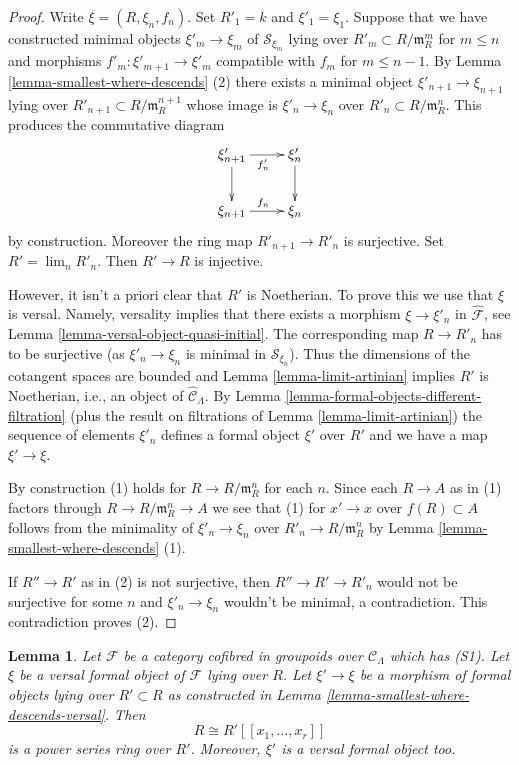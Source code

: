 \documentclass{stacks-project}
\theoremstyle{plain}
\newtheorem{lemma}[subsection]{Lemma}
\theoremstyle{definition}
\theoremstyle{remark}
\numberwithin{equation}{subsection}
\def\lim{\mathop{\mathrm{lim}}\nolimits}
\begin{document}
\begin{proof}
Write $\xi = (R, \xi_n, f_n)$. Set $R'_1 = k$ and
$\xi'_1 = \xi_1$. Suppose that we have constructed
minimal objects $\xi'_m \to \xi_m$ of $\mathcal{S}_{\xi_m}$
lying over $R'_m \subset R/\mathfrak m_R^m$ for $m \leq n$
and morphisms $f'_m : \xi'_{m + 1} \to \xi'_m$ compatible with $f_m$
for $m \leq n - 1$. By
Lemma \ref{lemma-smallest-where-descends} (2)
there exists a minimal object $\xi'_{n + 1} \to \xi_{n + 1}$ lying over
$R'_{n + 1} \subset R/\mathfrak m_R^{n + 1}$ whose image
is $\xi'_n \to \xi_n$ over $R'_n \subset R/\mathfrak m_R^n$.
This produces the commutative diagram
$$
\xymatrix{
\xi'_{n + 1} \ar[r]_{f'_n} \ar[d] & \xi'_n \ar[d] \\
\xi_{n + 1} \ar[r]^{f_n} & \xi_n
}
$$
by construction. Moreover the ring map $R'_{n + 1} \to R'_n$
is surjective. Set $R' = \lim_n R'_n$. Then $R' \to R$ is injective.

\medskip\noindent
However, it isn't a priori clear that $R'$ is Noetherian. To prove this
we use that $\xi$ is versal. Namely, versality implies that there exists
a morphism $\xi \to \xi'_n$ in $\widehat{\mathcal{F}}$, see
Lemma \ref{lemma-versal-object-quasi-initial}.
The corresponding map $R \to R'_n$ has to be surjective (as
$\xi'_n \to \xi_n$ is minimal in $\mathcal{S}_{\xi_n}$).
Thus the dimensions of the cotangent spaces are bounded and
Lemma \ref{lemma-limit-artinian}
implies $R'$ is Noetherian, i.e., an object of $\widehat{\mathcal{C}}_\Lambda$.
By
Lemma \ref{lemma-formal-objects-different-filtration}
(plus the result on filtrations of
Lemma \ref{lemma-limit-artinian})
the sequence of elements $\xi'_n$ defines a formal object $\xi'$ over $R'$
and we have a map $\xi' \to \xi$.

\medskip\noindent
By construction (1) holds for $R \to R/\mathfrak m_R^n$ for each $n$.
Since each $R \to A$ as in (1) factors through $R \to R/\mathfrak m_R^n \to A$
we see that (1) for $x' \to x$ over $f(R) \subset A$ follows from the
minimality of $\xi'_n \to \xi_n$ over $R'_n \to R/\mathfrak m_R^n$ by
Lemma \ref{lemma-smallest-where-descends} (1).

\medskip\noindent
If $R'' \to R'$ as in (2) is not surjective, then $R'' \to R' \to R'_n$
would not be surjective for some $n$ and $\xi'_n \to \xi_n$ wouldn't
be minimal, a contradiction. This contradiction proves (2).
\end{proof}

\begin{lemma}
\label{lemma-descends-versal}
Let $\mathcal{F}$ be a category cofibred in groupoids over
$\mathcal{C}_\Lambda$ which has (S1). Let $\xi$ be a versal formal object
of $\mathcal{F}$ lying over $R$. Let $\xi' \to \xi$ be a morphism
of formal objects lying over $R' \subset R$ as constructed in
Lemma \ref{lemma-smallest-where-descends-versal}.
Then
$$
R \cong R'[[x_1, \ldots, x_r]]
$$
is a power series ring over $R'$.
Moreover, $\xi'$ is a versal formal object too.
\end{lemma}
\end{document}
